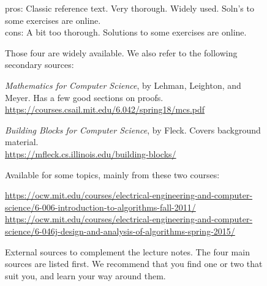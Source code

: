 \documentclass[11pt]{article}
\begin{document}
\begin{figure}
\begin{myframed}
\begin{description}
      pros: Classic reference text.  Very thorough.  Widely used.  Soln's to some exercises are online.
      \\cons: A bit too thorough. Solutions to some exercises are online.
\end{description}

Those four are widely available.  We also refer to the following secondary sources:

\begin{description}\small


\item[(\href{https://courses.csail.mit.edu/6.042/spring18/mcs.pdf}{LLM})] \emph{Mathematics for Computer Science}, by Lehman, Leighton, and Meyer.
  Has a few good sections on proofs.
  \url{https://courses.csail.mit.edu/6.042/spring18/mcs.pdf}

\item[(\MF)] \emph{Building Blocks for Computer Science}, by Fleck.  Covers background material.
  \\
  \url{https://mfleck.cs.illinois.edu/building-blocks/}
  
\item[MIT lecture videos.] Available for some topics, mainly from these two courses:
  
  \parbox{0.8\textwidth}{
\url{https://ocw.mit.edu/courses/electrical-engineering-and-computer-science/6-006-introduction-to-algorithms-fall-2011/}
 \\[1ex] \url{https://ocw.mit.edu/courses/electrical-engineering-and-computer-science/6-046j-design-and-analysis-of-algorithms-spring-2015/}
}
\end{description}  
\vspace*{-10pt}
\end{myframed}
\caption{External sources to complement the lecture notes.  The four main sources are listed first.
  We recommend that you find one or two that suit you, and learn your way around them.}\label{prelim: fig: sources}
\end{figure}

\end{document}
